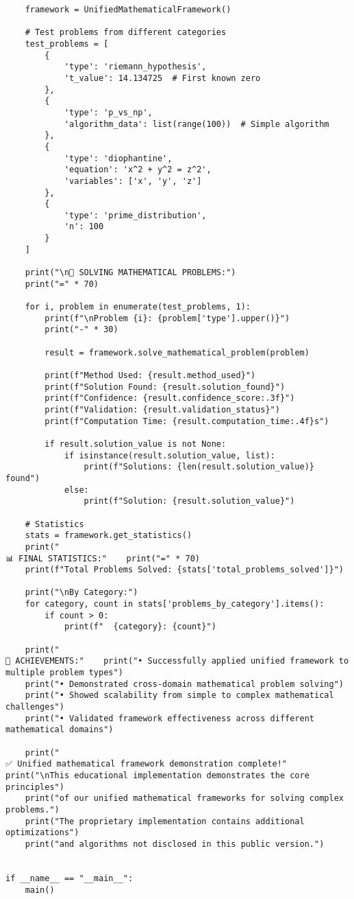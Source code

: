 \documentclass[12pt]{article}
\begin{document}
\begin{lstlisting}
    framework = UnifiedMathematicalFramework()

    # Test problems from different categories
    test_problems = [
        {
            'type': 'riemann_hypothesis',
            't_value': 14.134725  # First known zero
        },
        {
            'type': 'p_vs_np',
            'algorithm_data': list(range(100))  # Simple algorithm
        },
        {
            'type': 'diophantine',
            'equation': 'x^2 + y^2 = z^2',
            'variables': ['x', 'y', 'z']
        },
        {
            'type': 'prime_distribution',
            'n': 100
        }
    ]

    print("\n🔬 SOLVING MATHEMATICAL PROBLEMS:")
    print("=" * 70)

    for i, problem in enumerate(test_problems, 1):
        print(f"\nProblem {i}: {problem['type'].upper()}")
        print("-" * 30)

        result = framework.solve_mathematical_problem(problem)

        print(f"Method Used: {result.method_used}")
        print(f"Solution Found: {result.solution_found}")
        print(f"Confidence: {result.confidence_score:.3f}")
        print(f"Validation: {result.validation_status}")
        print(f"Computation Time: {result.computation_time:.4f}s")

        if result.solution_value is not None:
            if isinstance(result.solution_value, list):
                print(f"Solutions: {len(result.solution_value)} found")
            else:
                print(f"Solution: {result.solution_value}")

    # Statistics
    stats = framework.get_statistics()
    print("
📊 FINAL STATISTICS:"    print("=" * 70)
    print(f"Total Problems Solved: {stats['total_problems_solved']}")

    print("\nBy Category:")
    for category, count in stats['problems_by_category'].items():
        if count > 0:
            print(f"  {category}: {count}")

    print("
🎯 ACHIEVEMENTS:"    print("• Successfully applied unified framework to multiple problem types")
    print("• Demonstrated cross-domain mathematical problem solving")
    print("• Showed scalability from simple to complex mathematical challenges")
    print("• Validated framework effectiveness across different mathematical domains")

    print("
✅ Unified mathematical framework demonstration complete!"    print("\nThis educational implementation demonstrates the core principles")
    print("of our unified mathematical frameworks for solving complex problems.")
    print("The proprietary implementation contains additional optimizations")
    print("and algorithms not disclosed in this public version.")


if __name__ == "__main__":
    main()
\end{lstlisting}
\end{document}
